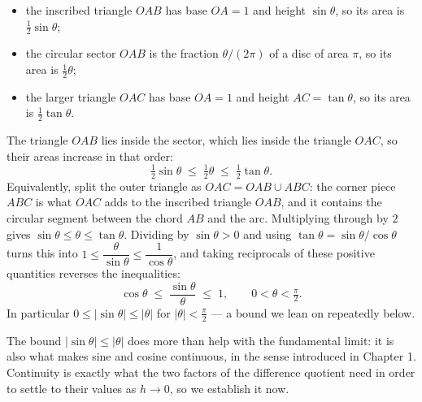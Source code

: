 \begin{itemize}
  \item the inscribed triangle \(OAB\) has base \(OA = 1\) and height \(\sin\theta\), so its area is \(\tfrac12 \sin\theta\);
  \item the circular sector \(OAB\) is the fraction \(\theta / (2\pi)\) of a disc of area \(\pi\), so its area is \(\tfrac12 \theta\);
  \item the larger triangle \(OAC\) has base \(OA = 1\) and height \(AC = \tan\theta\), so its area is \(\tfrac12 \tan\theta\).
\end{itemize}
The triangle \(OAB\) lies inside the sector, which lies inside the triangle \(OAC\), so their areas increase in that order: \[ \tfrac12 \sin\theta \;\le\; \tfrac12 \theta \;\le\; \tfrac12 \tan\theta. \] Equivalently, split the outer triangle as \(OAC = OAB \cup ABC\): the corner piece \(ABC\) is what \(OAC\) adds to the inscribed triangle \(OAB\), and it contains the circular segment between the chord \(AB\) and the arc. Multiplying through by \(2\) gives \(\sin\theta \le \theta \le \tan\theta\). Dividing by \(\sin\theta > 0\) and using \(\tan\theta = \sin\theta/\cos\theta\) turns this into \(1 \le \dfrac{\theta}{\sin\theta} \le \dfrac{1}{\cos\theta}\), and taking reciprocals of these positive quantities reverses the inequalities: \[ \cos\theta \;\le\; \frac{\sin\theta}{\theta} \;\le\; 1, \qquad 0 < \theta < \tfrac{\pi}{2}. \tag{1} \] In particular \(0 \le \lvert \sin\theta \rvert \le \lvert \theta \rvert\) for \(\lvert \theta \rvert < \tfrac{\pi}{2}\) — a bound we lean on repeatedly below.

The bound \(\lvert \sin\theta \rvert \le \lvert \theta \rvert\) does more than help with the fundamental limit: it is also what makes sine and cosine continuous, in the sense introduced in Chapter 1. Continuity is exactly what the two factors of the difference quotient need in order to settle to their values as \(h \to 0\), so we establish it now.

